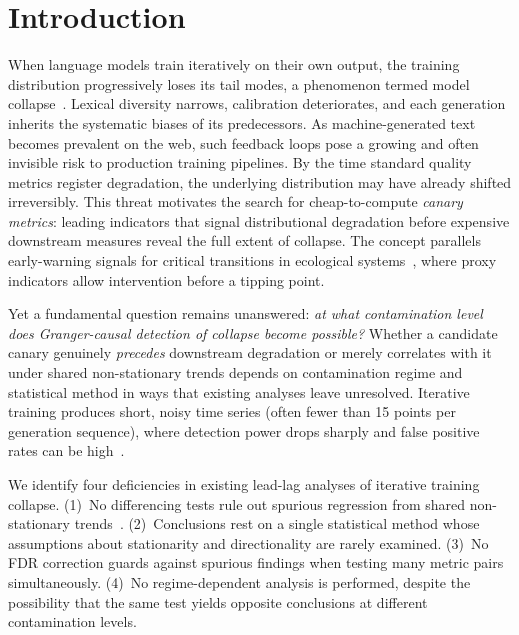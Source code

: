 \section{Introduction}
\label{sec:introduction}

When language models train iteratively on their own output, the training distribution progressively loses its tail modes, a phenomenon termed model collapse~\cite{shumailov2024curse,alemohammad2024mad}.
Lexical diversity narrows, calibration deteriorates, and each generation inherits the systematic biases of its predecessors.
As machine-generated text becomes prevalent on the web, such feedback loops pose a growing and often invisible risk to production training pipelines.
By the time standard quality metrics register degradation, the underlying distribution may have already shifted irreversibly.
This threat motivates the search for cheap-to-compute \emph{canary metrics}: leading indicators that signal distributional degradation before expensive downstream measures reveal the full extent of collapse.
The concept parallels early-warning signals for critical transitions in ecological systems~\cite{scheffer2009early,scheffer2012anticipating}, where proxy indicators allow intervention before a tipping point.

Yet a fundamental question remains unanswered: \emph{at what contamination level does Granger-causal detection of collapse become possible?}
Whether a candidate canary genuinely \emph{precedes} downstream degradation or merely correlates with it under shared non-stationary trends depends on contamination regime and statistical method in ways that existing analyses leave unresolved.
Iterative training produces short, noisy time series (often fewer than 15 points per generation sequence), where detection power drops sharply and false positive rates can be high~\cite{boettiger2012limits}.

We identify four deficiencies in existing lead-lag analyses of iterative training collapse.
(1)~No differencing tests rule out spurious regression from shared non-stationary trends~\cite{granger1974spurious}.
(2)~Conclusions rest on a single statistical method whose assumptions about stationarity and directionality are rarely examined.
(3)~No FDR correction guards against spurious findings when testing many metric pairs simultaneously.
(4)~No regime-dependent analysis is performed, despite the possibility that the same test yields opposite conclusions at different contamination levels.

